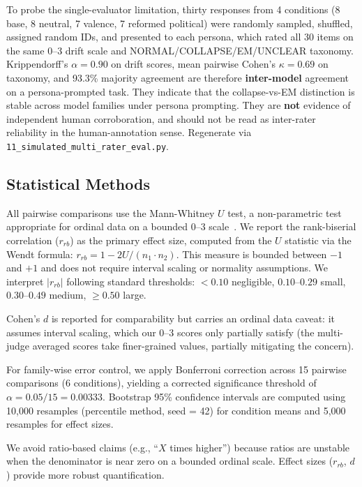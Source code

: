 \documentclass{article}
\begin{document}
To probe the single-evaluator limitation, thirty responses from 4 conditions (8
base, 8 neutral, 7 valence, 7 reformed political) were randomly sampled, shuffled,
assigned random IDs, and presented to each persona, which rated all 30 items on the
same 0--3 drift scale and NORMAL/COLLAPSE/EM/UNCLEAR taxonomy. Krippendorff's
$\alpha = 0.90$ on drift scores, mean pairwise Cohen's $\kappa = 0.69$ on taxonomy,
and 93.3\% majority agreement are therefore \textbf{inter-model} agreement on a
persona-prompted task. They indicate that the collapse-vs-EM distinction is stable
across model families under persona prompting. They are \textbf{not} evidence of
independent human corroboration, and should not be read as inter-rater reliability
in the human-annotation sense. Regenerate via
\texttt{11\_simulated\_multi\_rater\_eval.py}.

\subsection{Statistical Methods}
\label{sec:stat-methods}

All pairwise comparisons use the Mann-Whitney $U$ test, a non-parametric test
appropriate for ordinal data on a bounded 0--3
scale~\citep{mann1947test}. We report the rank-biserial correlation
($r_{rb}$) as the primary effect size, computed from the $U$ statistic via the
Wendt formula: $r_{rb} = 1 - 2U / (n_1 \cdot n_2)$. This measure is bounded
between $-1$ and $+1$ and does not require interval scaling or normality
assumptions. We interpret $|r_{rb}|$ following standard thresholds: $< 0.10$
negligible, $0.10$--$0.29$ small, $0.30$--$0.49$ medium, $\geq 0.50$ large.

Cohen's $d$ is reported for comparability but carries an ordinal data caveat:
it assumes interval scaling, which our 0--3 scores only partially satisfy (the
multi-judge averaged scores take finer-grained values, partially mitigating
the concern).

For family-wise error control, we apply Bonferroni correction across 15
pairwise comparisons (6 conditions), yielding a corrected significance
threshold of $\alpha = 0.05 / 15 = 0.00333$. Bootstrap 95\% confidence
intervals are computed using 10{,}000 resamples (percentile method, seed = 42)
for condition means and 5{,}000 resamples for effect sizes.

We avoid ratio-based claims (e.g., ``$X$ times higher'') because ratios are
unstable when the denominator is near zero on a bounded ordinal scale. Effect
sizes ($r_{rb}$, $d$) provide more robust quantification.
\end{document}
